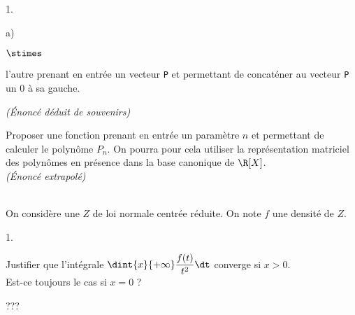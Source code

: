 \documentclass[11pt]{article}%
\begin{document}
\begin{exerciceAP}
\begin{noliste}{1.}
\begin{noliste}{a)}
\begin{noliste}{$\stimes$}
      \item l'autre prenant en entrée un vecteur {\tt P} et permettant
        de concaténer au vecteur {\tt P} un $0$ à sa gauche.
      \end{noliste}
      {\it (\'Enoncé déduit de souvenirs)}
      
    \item Proposer une fonction \Scilab{} prenant en entrée un
      paramètre $n$ et permettant de calculer le
      polynôme $P_n$. On pourra pour cela utiliser la représentation
      matriciel des polynômes en présence dans la base
      canonique de $\R[X]$.\\
      {\it (\'Enoncé extrapolé)}
    \end{noliste}
  \end{noliste}
\end{exerciceAP}


\begin{exerciceSP}~\\
  On considère une \var $Z$ de loi normale centrée réduite. On note
  $f$ une densité de $Z$.
  \begin{noliste}{1.}
  \item Justifier que l'intégrale $\dint{x}{+\infty} \dfrac{f(t)}{t^2}
    \dt$ converge si $x>0$.\\
    Est-ce toujours le cas si $x=0$ ?
    
  \item ???
  \end{noliste}
\end{exerciceSP}


\end{document}

